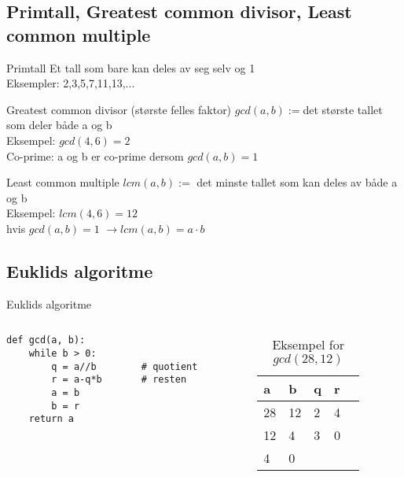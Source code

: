 \subsection*{Primtall, Greatest common divisor, Least common multiple}
\begin{frame}
\begin{block}{Primtall}
Et tall som bare kan deles av seg selv og 1\\
Eksempler: 2,3,5,7,11,13,...
\end{block}

\begin{block}{Greatest common divisor (største felles faktor)}
$gcd(a,b) := $det største tallet som deler både a og b\\
Eksempel: $gcd(4,6)=2$\\
Co-prime: a og b er co-prime dersom $gcd(a,b)=1$
\end{block}

\begin{block}{Least common multiple}
$lcm(a,b) := $ det minste tallet som kan deles av både a og b\\
Eksempel: $lcm(4,6)=12$\\
hvis $gcd(a,b) = 1$ $\rightarrow lcm(a,b) = a\cdot b$
\end{block}
\end{frame}

\subsection*{Euklids algoritme}
\begin{frame}[fragile]{Euklids algoritme}
\begin{columns}
    \begin{column}{0.58\textwidth}
\begin{verbatim}
def gcd(a, b):
    while b > 0:
        q = a//b        # quotient
        r = a-q*b       # resten
        a = b
        b = r
    return a
\end{verbatim}
 	\end{column}
    \begin{column}{0.38\textwidth}
\begin{table}
\begin{tabular}{l|l|l|l|l}
a & b & q & r \\ \hline
28 & 12 & 2 & 4\\
12 & 4 & 3 & 0\\
4 & 0 &  & 
\end{tabular}
\caption{Eksempel for $gcd(28,12)$}
\end{table}
 	\end{column}
\end{columns}


\end{frame}

